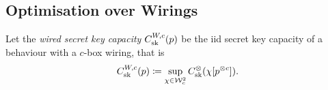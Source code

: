 \documentclass[10pt, a4paper]{article}
\numberwithin{equation}{section} %
\theoremstyle{definition}
\theoremstyle{plain}
\newcommand{\?}{\mathrel{?}} %
\newcommand{\sW}{\mathcal{W}}
\newcommand{\sk}{\rm sk}
\begin{document}
                      \subsection{Optimisation over Wirings}\label{sec:krwir_wiropt}


                      Let the \emph{wired secret key capacity} \(C^{W,c}_{\sk}(p)\) be the iid secret key capacity of a behaviour with a \(c\)-box wiring, that is
                      \begin{equation}
                        C^{W,c}_{\sk}(p) \coloneqq \sup_{\chi\in\sW_c^2} C^{\otimes}_{\sk}(\chi[p^{\otimes c}]).
                      \end{equation}
\end{document}
